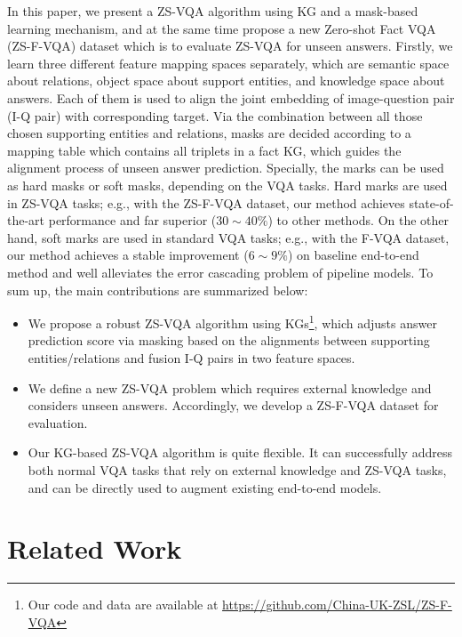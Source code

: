 \documentclass[runningheads]{llncs}
\newcommand{\cjy}[1]{{\color{black}#1}}
\newcommand{\jeff}[1]{{\color{black}#1}}
\begin{document}
\cjy{In this paper, we present a ZS-VQA algorithm using KG and a mask-based learning mechanism, and at the same time propose a new Zero-shot Fact VQA (ZS-F-VQA) dataset which is to evaluate ZS-VQA for unseen answers. }
\jeff{Firstly, we} learn three different feature mapping spaces separately, which are semantic space about \jeff{relations}, object space about support \jeff{entities}, and knowledge space about \jeff{answers}. Each of them is used to align the joint embedding of image-question pair (I-Q pair) with corresponding target.
Via the combination between all those chosen supporting entities and relations, masks are decided according to a mapping table which contains all triplets in \jeff{a} fact KG, \jeff{which guides} 
the alignment process of unseen answer prediction. 
Specially,
\jeff{the marks can be used as hard masks or soft masks, depending on the VQA tasks.} 
\jeff{Hard marks are used in ZS-VQA tasks; e.g., with the  ZS-F-VQA  dataset,} 
our method achieves state-of-the-art performance and far superior ($30 \sim 40\%$) to other methods.
\jeff{On the other hand, soft marks are used in standard VQA tasks; e.g., with the F-VQA dataset, } 
our method achieves a stable improvement ($6 \sim 9\%$) on baseline end-to-end method and well \cjy{alleviates} the error cascading problem of pipeline models.
\jeff{To sum up, } the main contributions are summarized below:
\begin{itemize}
    \item We propose a \cjy{robust ZS-VQA algorithm using KGs\footnote{\jeff{Our} code and data are available at
\url{https://github.com/China-UK-ZSL/ZS-F-VQA}}}, which adjusts answer prediction score via masking based on the alignments between supporting \jeff{entities/relations} and fusion I-Q pairs in two feature spaces. 
    \item \cjy{We define a new ZS-VQA problem which requires external knowledge and considers unseen answers.
    Accordingly, we develop a ZS-F-VQA dataset for evaluation.}
    \item \cjy{Our KG-based ZS-VQA algorithm is quite flexible. It can successfully address both normal VQA tasks that rely on external knowledge and ZS-VQA tasks, and can be directly used to augment existing end-to-end models.}
\end{itemize}
\section{Related Work} 
\end{document}
